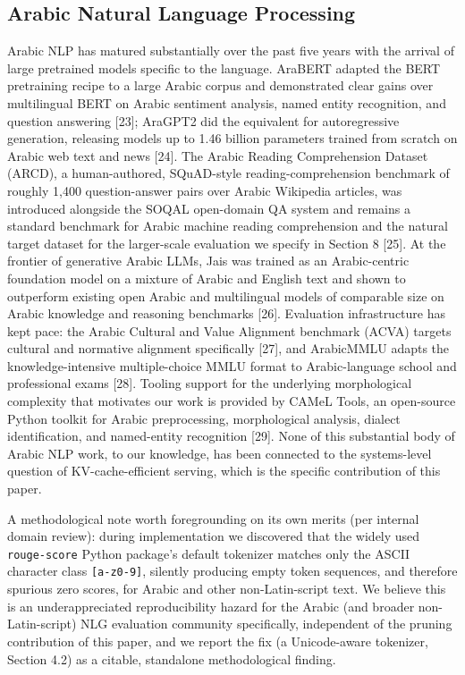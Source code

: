 \subsection{Arabic Natural Language Processing}
Arabic NLP has matured substantially over the past five years with the arrival of large pretrained models specific to the language. AraBERT adapted the BERT pretraining recipe to a large Arabic corpus and demonstrated clear gains over multilingual BERT on Arabic sentiment analysis, named entity recognition, and question answering [23]; AraGPT2 did the equivalent for autoregressive generation, releasing models up to 1.46 billion parameters trained from scratch on Arabic web text and news [24]. The Arabic Reading Comprehension Dataset (ARCD), a human-authored, SQuAD-style reading-comprehension benchmark of roughly 1,400 question-answer pairs over Arabic Wikipedia articles, was introduced alongside the SOQAL open-domain QA system and remains a standard benchmark for Arabic machine reading comprehension and the natural target dataset for the larger-scale evaluation we specify in Section 8 [25]. At the frontier of generative Arabic LLMs, Jais was trained as an Arabic-centric foundation model on a mixture of Arabic and English text and shown to outperform existing open Arabic and multilingual models of comparable size on Arabic knowledge and reasoning benchmarks [26]. Evaluation infrastructure has kept pace: the Arabic Cultural and Value Alignment benchmark (ACVA) targets cultural and normative alignment specifically [27], and ArabicMMLU adapts the knowledge-intensive multiple-choice MMLU format to Arabic-language school and professional exams [28]. Tooling support for the underlying morphological complexity that motivates our work is provided by CAMeL Tools, an open-source Python toolkit for Arabic preprocessing, morphological analysis, dialect identification, and named-entity recognition [29]. None of this substantial body of Arabic NLP work, to our knowledge, has been connected to the systems-level question of KV-cache-efficient serving, which is the specific contribution of this paper.

A methodological note worth foregrounding on its own merits (per internal domain review): during implementation we discovered that the widely used \texttt{rouge-score} Python package's default tokenizer matches only the ASCII character class \texttt{[a-z0-9]}, silently producing empty token sequences, and therefore spurious zero scores, for Arabic and other non-Latin-script text. We believe this is an underappreciated reproducibility hazard for the Arabic (and broader non-Latin-script) NLG evaluation community specifically, independent of the pruning contribution of this paper, and we report the fix (a Unicode-aware tokenizer, Section 4.2) as a citable, standalone methodological finding.


